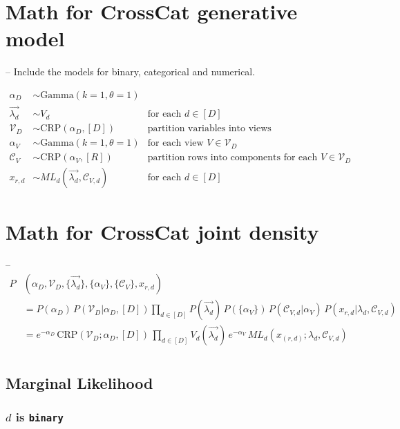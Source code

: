 \documentclass{article}
\newcommand{\iV}{\mathit{V}}
\newcommand{\set}[1]{\{{#1}\}}
\begin{document}
\section{Math for CrossCat generative model}
-- Include the models for binary, categorical and numerical.

\begin{align*}
  \alpha_D &\sim \text{Gamma}(k=1, \theta=1)  & \\
  \vec{\lambda_d} &\sim V_d & \text{for each } d \in [D]  \\
  \mathcal{V}_D &\sim \text{CRP}( \alpha_D, [D]) & \text{partition variables into views}\\
  \alpha_\iV &\sim \text{Gamma}(k=1, \theta=1)  & \text{for each view } \iV \in \mathcal{V}_D \\
  \mathcal{C}_\iV &\sim \text{CRP}( \alpha_\iV, [R]) &\text{partition rows into components for each } \iV \in \mathcal{V}_D\\
  x_{r,d} &\sim {\displaystyle \mathit{ML}_d( \vec{\lambda_d}, \mathcal{C}_{\iV,d})} 
                                        & \text{for each } d \in [D]
\end{align*}

\section{Math for CrossCat joint density}
--
\begin{align*}
  P&(\alpha_D, \mathcal{V}_D, \set{\vec{\lambda_d}}, \set{\alpha_\iV}, \set{\mathcal{C}_\iV}, x_{r,d})
    \\
   &= P(\alpha_D)  \,   
      P(\mathcal{V}_D|\alpha_D, [D])   
      \prod_{d \in [D]} P(\vec{\lambda_d}) \, 
      P(\set{\alpha_\iV}) \,
      P(\mathcal{C}_{\iV,d}|\alpha_\iV) \,
      P(x_{r,d}| \lambda_d, \mathcal{C}_{\iV,d})
  \\
    &= e^{-\alpha_D}\, 
       \text{CRP}(\mathcal{V}_D; \alpha_D, [D])
       \,\prod_{d \in [D]} V_d(\vec{\lambda_d}) \,
       e^{-\alpha_\iV}\,
       \mathit{ML}_d(x_{(r,d)}; \lambda_d, \mathcal{C}_{\iV, d})\\
\end{align*}

\subsection{Marginal Likelihood}

\subsubsection{$d$ is \texttt{binary}}
\end{document}
